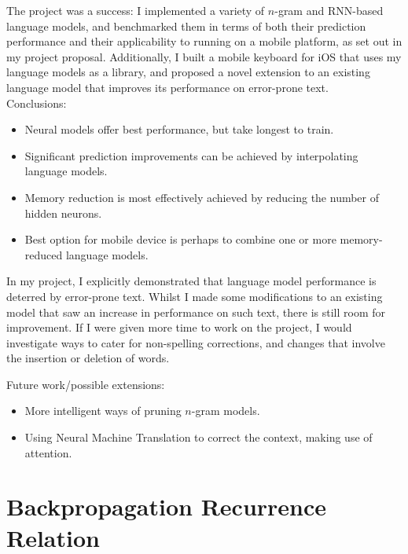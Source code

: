 \documentclass[a4paper, 12pt]{report}
\begin{document}
The project was a success: I implemented a variety of $n$-gram and RNN-based language models, and benchmarked them in terms of both their prediction performance and their applicability to running on a mobile platform, as set out in my project proposal. Additionally, I built a mobile keyboard for iOS that uses my language models as a library, and proposed a novel extension to an existing language model that improves its performance on error-prone text. \\

Conclusions:
\begin{itemize}
\item
	Neural models offer best performance, but take longest to train.
\item
	Significant prediction improvements can be achieved by interpolating language models.
\item
	Memory reduction is most effectively achieved by reducing the number of hidden neurons.
\item
	Best option for mobile device is perhaps to combine one or more memory-reduced language models.
\end{itemize}

In my project, I explicitly demonstrated that language model performance is deterred by error-prone text. Whilst I made some modifications to an existing model that saw an increase in performance on such text, there is still room for improvement. If I were given more time to work on the project, I would investigate ways to cater for non-spelling corrections, and changes that involve the insertion or deletion of words.

Future work/possible extensions:
\begin{itemize}
\item
	More intelligent ways of pruning $n$-gram models.
\item
	Using Neural Machine Translation to correct the context, making use of attention.	
\end{itemize}




\appendix

\chapter{Backpropagation Recurrence Relation} \label{appendix:bp_recurrence}
\end{document}
